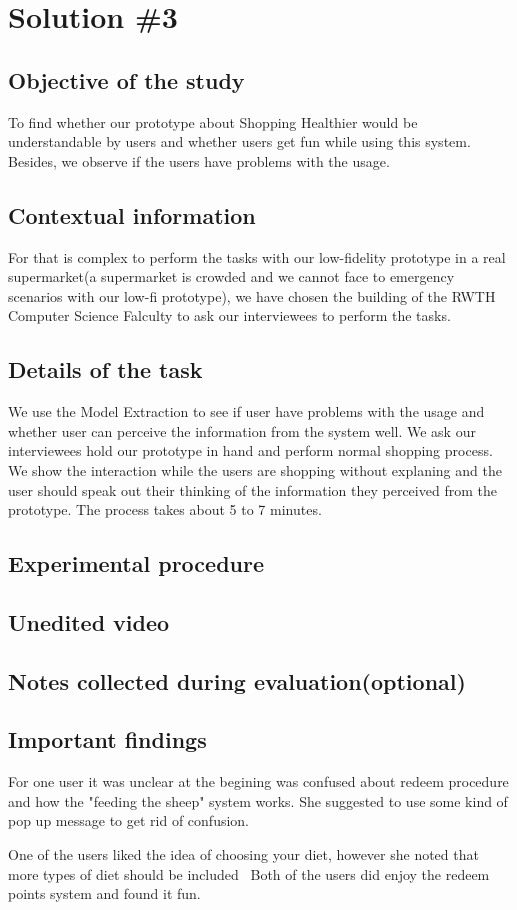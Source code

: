 \section{Solution \#3}

\subsection{Objective of the study}
To find whether our prototype about Shopping Healthier would be understandable by users and whether users get fun while using this system. Besides, we observe if the users have problems with the usage.

\subsection{Contextual information}
For that is complex to perform the tasks with our low-fidelity prototype in a real supermarket(a supermarket is crowded and we cannot face to emergency scenarios with our low-fi prototype), we have chosen the building of the RWTH Computer Science Falculty to ask our interviewees to perform the tasks.

\subsection{Details of the task}
We use the Model Extraction to see if user have problems with the usage and whether user can  perceive the information from the system well. We ask our interviewees hold our prototype in hand and perform normal shopping process. We show the interaction while the users are shopping without explaning and the user should speak out their thinking of the information they perceived from the prototype. The process takes about 5 to 7 minutes.

\subsection{Experimental procedure}


\subsection{Unedited video}

\subsection{Notes collected during evaluation(optional)}

\subsection{Important findings}
 \item For one user it was unclear at the begining was confused about redeem procedure and how the "feeding the sheep" system
works. She suggested to use some kind of pop up message to get rid of confusion.
 \item One of the users liked the idea of choosing your diet, however she noted that more types of diet should be included
 \ Both of the users did enjoy the redeem points system and found it fun.
